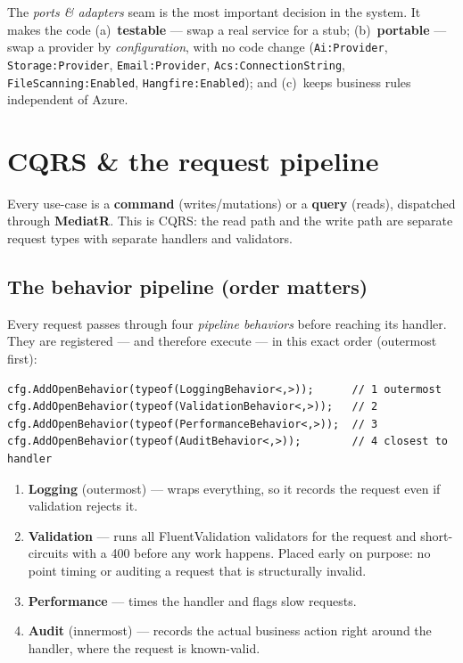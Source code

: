 \documentclass[11pt,a4paper]{article}
\newcommand{\code}[1]{\texttt{\textcolor{spInk}{#1}}}
\begin{document}
\begin{whybox}
The \emph{ports \& adapters} seam is the most important decision in the system.
It makes the code (a)~\textbf{testable} --- swap a real service for a stub;
(b)~\textbf{portable} --- swap a provider by \emph{configuration}, with no code
change (\code{Ai:Provider}, \code{Storage:Provider}, \code{Email:Provider},
\code{Acs:ConnectionString}, \code{FileScanning:Enabled}, \code{Hangfire:Enabled});
and (c)~keeps business rules independent of Azure.
\end{whybox}

\section{CQRS \& the request pipeline}

Every use-case is a \textbf{command} (writes/mutations) or a \textbf{query}
(reads), dispatched through \textbf{MediatR}. This is CQRS: the read path and the
write path are separate request types with separate handlers and validators.

\subsection{The behavior pipeline (order matters)}
Every request passes through four \emph{pipeline behaviors} before reaching its
handler. They are registered --- and therefore execute --- in this exact order
(outermost first):

\begin{lstlisting}
cfg.AddOpenBehavior(typeof(LoggingBehavior<,>));      // 1 outermost
cfg.AddOpenBehavior(typeof(ValidationBehavior<,>));   // 2
cfg.AddOpenBehavior(typeof(PerformanceBehavior<,>));  // 3
cfg.AddOpenBehavior(typeof(AuditBehavior<,>));        // 4 closest to handler
\end{lstlisting}

\begin{enumerate}
\item \textbf{Logging} (outermost) --- wraps everything, so it records the request
  even if validation rejects it.
\item \textbf{Validation} --- runs all FluentValidation validators for the request
  and short-circuits with a 400 before any work happens. Placed early on purpose:
  no point timing or auditing a request that is structurally invalid.
\item \textbf{Performance} --- times the handler and flags slow requests.
\item \textbf{Audit} (innermost) --- records the actual business action right
  around the handler, where the request is known-valid.
\end{enumerate}
\end{document}
